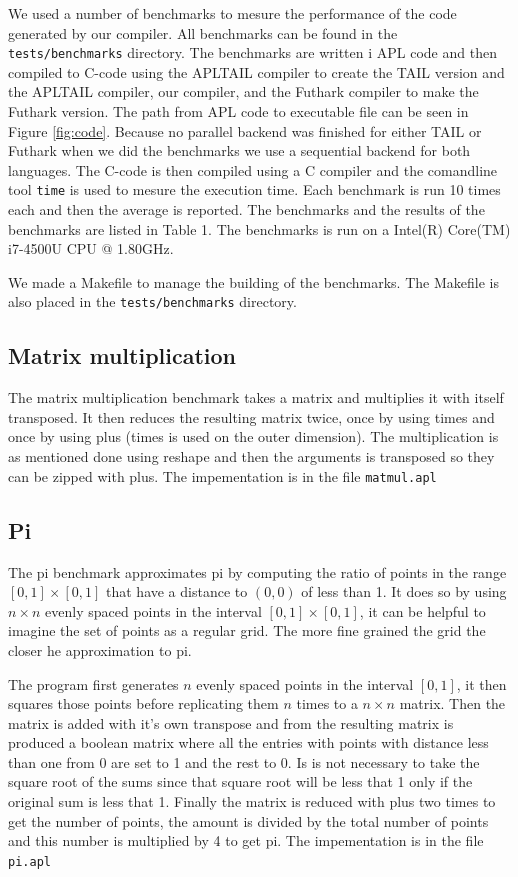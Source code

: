 \documentclass[11pt]{article}
\begin{document}
We used a number of benchmarks to mesure the performance of the code generated by our compiler. 
All benchmarks can be found in the {\tt tests/benchmarks} directory. 
The benchmarks are written i APL code and then compiled to C-code using the APLTAIL compiler to create the TAIL version and the APLTAIL compiler, our compiler, and the Futhark compiler to make the Futhark version. The path from APL code to executable file can be seen in Figure \ref{fig:code}.
Because no parallel backend was finished for either TAIL or Futhark when we did the benchmarks we use a sequential backend for both languages. 
The C-code is then compiled using a C compiler and the comandline tool {\tt time} is used to mesure the execution time. Each benchmark is run 10 times each and then the average is reported. The benchmarks and the results of the benchmarks are listed in Table 1.
The benchmarks is run on a Intel(R) Core(TM) i7-4500U CPU @ 1.80GHz. 

We made a Makefile to manage the building of the benchmarks. The Makefile is also placed in the {\tt tests/benchmarks} directory.



\subsection{Matrix multiplication}
The matrix multiplication benchmark takes a matrix and multiplies it with itself transposed.
It then reduces the resulting matrix twice, once by using times and once by using plus (times is used on the outer dimension).
The multiplication is as mentioned done using reshape and then the arguments is transposed so they can be zipped with plus.
The impementation is in the file {\tt matmul.apl}
\subsection{Pi}
The pi benchmark approximates pi by computing the ratio of points in the range $[0,1] \times [0,1]$ that have a distance to $(0,0)$ of less than 1.
It does so by using $n \times n$ evenly spaced points in the interval $[0,1] \times [0,1]$, it can be helpful to imagine the set of points as a regular grid.
The more fine grained the grid the closer he approximation to pi.

The program first generates $n$ evenly spaced points in the interval $[0,1]$, it then squares those points before replicating them $n$ times to a $n \times n$ matrix.
Then the matrix is added with it's own transpose and from the resulting matrix is produced a boolean matrix
where all the entries with points with distance less than one from 0 are set to 1 and the rest to 0. Is is not necessary to take
the square root of the sums since that square root will be less that 1 only if the original sum is less that 1.
Finally the matrix is reduced with plus two times to get the number of points, the amount is divided by the total number of points and
this number is multiplied by 4 to get pi.
The impementation is in the file {\tt pi.apl}
\end{document}
